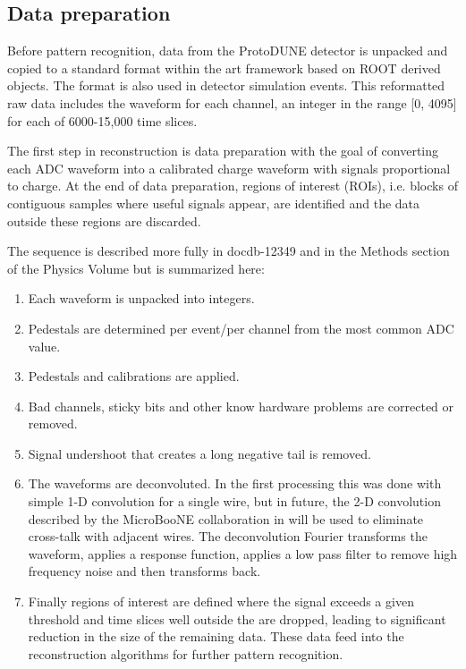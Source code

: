 \subsection{Data preparation}

Before pattern recognition, data from the ProtoDUNE detector is
unpacked and copied to a standard format within the art framework based on ROOT derived objects.
The format is also used in detector simulation events.
This reformatted raw data includes the waveform for each channel, an
integer in the range [0, 4095] for each of 6000-15,000 time slices.

The first step in reconstruction is data preparation with the goal of
converting each ADC waveform into a calibrated charge waveform with
signals proportional to charge. At the end of data preparation, regions of interest (ROIs), i.e. blocks of contiguous samples where
useful signals appear, are identified and the data outside these regions are discarded.


The sequence is described more fully in docdb-12349 and in the Methods section of the Physics Volume but is summarized here:

\begin{enumerate}
\item Each waveform is unpacked into integers.
\item Pedestals are determined per event/per channel from the most common ADC value.
\item Pedestals and calibrations are applied. %
\item Bad channels, sticky bits and other know hardware problems are corrected or removed.
\item Signal undershoot that creates a long negative tail is removed.
\item The waveforms  are deconvoluted.  In the first processing this was done with simple 1-D  convolution for a single wire, but in future, the 2-D convolution described by the MicroBooNE collaboration in  will be used to eliminate cross-talk with adjacent wires.  The deconvolution Fourier transforms the waveform, applies a response function, applies a low pass filter to remove high frequency noise and then transforms back.



\item Finally regions of interest are defined where the signal exceeds a given threshold and time slices well outside the  are dropped, leading to significant reduction in the size of the remaining data. These data feed into the reconstruction algorithms for further pattern recognition. %
\end{enumerate}




